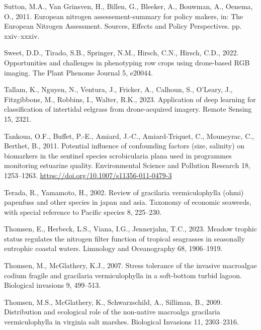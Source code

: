 \documentclass[
  letterpaper,
  11pt,
  english,
  singlespacing,
  headsepline]{MastersDoctoralThesis}
\newlength{\cslhangindent}
\newenvironment{CSLReferences}[2] %
 {\begin{list}{}{%
  \setlength{\itemindent}{0pt}
  \setlength{\leftmargin}{0pt}
  \setlength{\parsep}{0pt}
  \ifodd #1
   \setlength{\leftmargin}{\cslhangindent}
   \setlength{\itemindent}{-1\cslhangindent}
  \fi
  \setlength{\itemsep}{#2\baselineskip}}}
 {\end{list}}
\begin{document}
\begin{CSLReferences}{1}{0}
Sutton, M.A., Van Grinsven, H., Billen, G., Bleeker, A., Bouwman, A.,
Oenema, O., 2011. European nitrogen assessement-summary for policy
makers, in: The European Nitrogen Assessment. Sources, Effects and
Policy Perspectives. pp. xxiv--xxxiv.

Sweet, D.D., Tirado, S.B., Springer, N.M., Hirsch, C.N., Hirsch, C.D.,
2022. Opportunities and challenges in phenotyping row crops using
drone-based RGB imaging. The Plant Phenome Journal 5, e20044.

Tallam, K., Nguyen, N., Ventura, J., Fricker, A., Calhoun, S., O'Leary,
J., Fitzgibbons, M., Robbins, I., Walter, R.K., 2023. Application of
deep learning for classification of intertidal eelgrass from
drone-acquired imagery. Remote Sensing 15, 2321.

Tankoua, O.F., Buffet, P.-E., Amiard, J.-C., Amiard-Triquet, C.,
Mouneyrac, C., Berthet, B., 2011. Potential influence of confounding
factors (size, salinity) on biomarkers in the sentinel species
scrobicularia plana used in programmes monitoring estuarine quality.
Environmental Science and Pollution Research 18, 1253--1263.
\url{https://doi.org/10.1007/s11356-011-0479-3}

Terada, R., Yamamoto, H., 2002. Review of gracilaria vermiculophylla
(ohmi) papenfuss and other species in japan and asia. Taxonomy of
economic seaweeds, with special reference to Pacific species 8,
225--230.

Thomsen, E., Herbeck, L.S., Viana, I.G., Jennerjahn, T.C., 2023. Meadow
trophic status regulates the nitrogen filter function of tropical
seagrasses in seasonally eutrophic coastal waters. Limnology and
Oceanography 68, 1906--1919.

Thomsen, M., McGlathery, K.J., 2007. Stress tolerance of the invasive
macroalgae codium fragile and gracilaria vermiculophylla in a
soft-bottom turbid lagoon. Biological invasions 9, 499--513.

Thomsen, M.S., McGlathery, K., Schwarzschild, A., Silliman, B., 2009.
Distribution and ecological role of the non-native macroalga gracilaria
vermiculophylla in virginia salt marshes. Biological Invasions 11,
2303--2316.


\end{CSLReferences}
\end{document}
